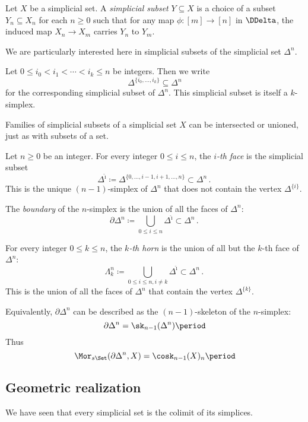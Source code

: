 \begin{definition}
  Let $X$ be a simplicial set.
  A \emph{simplicial subset} $Y \subseteq X$ is a choice of a subset $Y_n \subseteq X_n$ for each $n \geq 0$ such that for any map $\phi \colon [m] \to [n]$ in $\DDelta$, the induced map $X_n \to X_m$ carries $Y_n$ to $Y_m$.
\end{definition}

\noindent We are particularly interested here in simplicial subsets of the simplicial set $\Delta^n$.

\begin{notation}
  Let $0 \leq i_0 < i_1 < \cdots < i_k \leq n$ be integers.
  Then we write
  \[
    \Delta^{\{i_0, \dots, i_k\}} \subseteq \Delta^n
  \]
  for the corresponding simplicial subset of $\Delta^n$.
  This simplicial subset is itself a $k$-simplex.
\end{notation}

Families of simplicial subsets of a simplicial set $X$ can be intersected or unioned, just as with subsets of a set.

\begin{definition}
  Let $n \geq 0$ be an integer.
  For every integer $0 \leq i \leq n$, the \emph{$i$-th face} is the simplicial subset 
  \[
    \Delta^{\hat{\imath}} \coloneq \Delta^{\{0,\dots,i-1,i+1,\dots,n\}} \subset \Delta^n \period
  \]
  This is the unique $(n-1)$-simplex of $\Delta^n$ that does not contain the vertex $\Delta^{\{i\}}$.

  The \emph{boundary} of the $n$-simplex is the union of all the faces of $\Delta^n$:
  \[
    \partial \Delta^n \coloneq \bigcup_{0 \leq i \leq n} \Delta^{\hat{\imath}} \subset \Delta^n \period
  \]

  For every integer $0 \leq k \leq n$, the \emph{$k$-th horn} is the union of all but the $k$-th face of $\Delta^n$:
  \[
    \Lambda^n_k \coloneq \bigcup_{0 \leq i \leq n, i \neq k} \Delta^{\hat{\imath}} \subset \Delta^n \period
  \]
  This is the union of all the faces of $\Delta^n$ that contain the vertex $\Delta^{\{k\}}$. 
\end{definition}

Equivalently, $\partial \Delta^n$ can be described as the $(n-1)$-skeleton of the $n$-simplex:
\[
  \partial \Delta^n = \sk_{n-1}(\Delta^n) \period
\]
Thus
\[
  \Mor_{s\Set}(\partial\Delta^n, X) = \cosk_{n-1}(X)_n \period
\]

\subsection{Geometric realization \inc}%
\label{sub:geometricrealization}
We have seen that every simplicial set is the colimit of its simplices.

